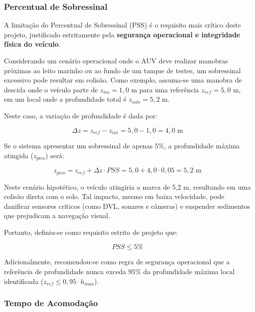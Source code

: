 \documentclass[12pt, a4paper]{article}
\begin{document}
			\subsubsection{Percentual de Sobressinal}

				A limitação do Percentual de Sobressinal (PSS) é o requisito mais crítico deste projeto, justificado estritamente pela \textbf{segurança operacional e integridade física do veículo}.

				Considerando um cenário operacional onde o AUV deve realizar manobras próximas ao leito marinho ou ao fundo de um tanque de testes, um sobressinal excessivo pode resultar em colisão. Como exemplo, assuma-se uma manobra de descida onde o veículo parte de $z_{ini} = 1,0 \text{ m}$ para uma referência $z_{ref} = 5,0 \text{ m}$, em um local onde a profundidade total é $z_{solo} = 5,2 \text{ m}$.

				Neste caso, a variação de profundidade é dada por:

				\begin{equation}
					\Delta z = z_{ref} - z_{ini} = 5,0 - 1,0 = 4,0 \text{ m}
				\end{equation}

				Se o sistema apresentar um sobressinal de apenas $5\%$, a profundidade máxima atingida ($z_{pico}$) será:

				\begin{equation}
					z_{pico} = z_{ref} + \Delta z \cdot PSS = 5,0 + 4,0 \cdot 0,05 = 5,2 \text{ m}
				\end{equation}

				Neste cenário hipotético, o veículo atingiria a marca de 5,2 m, resultando em uma colisão direta com o solo. Tal impacto, mesmo em baixa velocidade, pode danificar sensores críticos (como DVL, sonares e câmeras) e suspender sedimentos que prejudicam a navegação visual.

				Portanto, definiu-se como requisito estrito de projeto que:

				\begin{equation}
					PSS \le 5\%
				\end{equation}

				Adicionalmente, recomendou-se como regra de segurança operacional que a referência de profundidade nunca exceda $95\%$ da profundidade máxima local identificada ($z_{ref} \le 0,95 \cdot h_{max}$).

			\subsubsection{Tempo de Acomodação}
\end{document}
